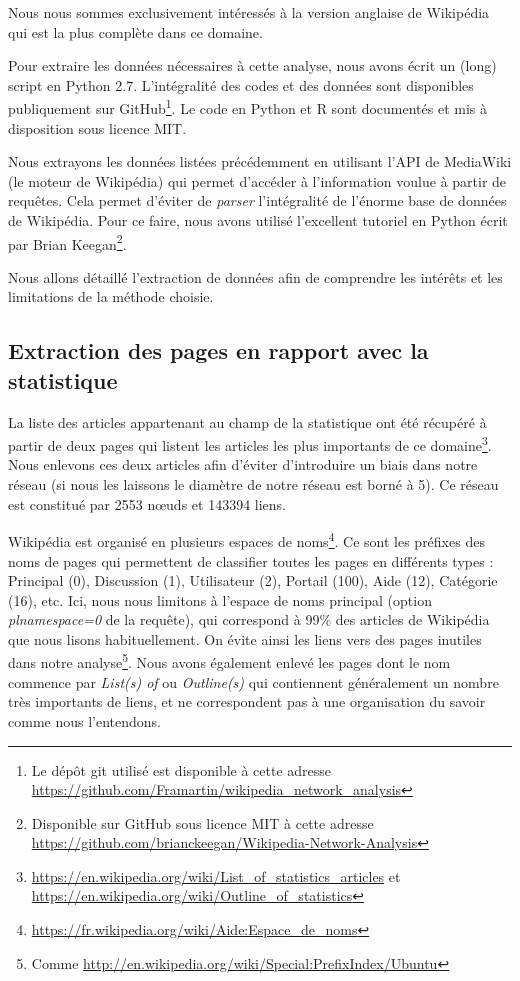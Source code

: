 \documentclass[a4paper]{article}
\begin{document}
Nous nous sommes exclusivement intéressés à la version anglaise de Wikipédia qui est la plus complète dans ce domaine.


Pour extraire les données nécessaires à cette analyse, nous avons écrit un (long) script en Python 2.7. L'intégralité des codes et des données sont disponibles publiquement sur GitHub\footnote{Le dépôt git utilisé est disponible à cette adresse \url{https://github.com/Framartin/wikipedia_network_analysis}}. Le code en Python et R sont documentés et mis à disposition sous licence MIT.

Nous extrayons les données listées précédemment en utilisant l'API de MediaWiki (le moteur de Wikipédia) qui permet d'accéder à l'information voulue à partir de requêtes. Cela permet d'éviter de \textit{parser} l'intégralité de l'énorme base de données de Wikipédia. Pour ce faire, nous avons utilisé l'excellent tutoriel en Python écrit par Brian Keegan\footnote{Disponible sur GitHub sous licence MIT à cette adresse \url{https://github.com/brianckeegan/Wikipedia-Network-Analysis}}.


Nous allons détaillé l'extraction de données afin de comprendre les intérêts et les limitations de la méthode choisie.

    \subsection{Extraction des pages en rapport avec la statistique}

La liste des articles appartenant au champ de la statistique ont été récupéré à partir de deux pages qui listent les articles les plus importants de ce domaine\footnote{\url{https://en.wikipedia.org/wiki/List_of_statistics_articles} et \url{https://en.wikipedia.org/wiki/Outline_of_statistics}}. Nous enlevons ces deux articles afin d'éviter d'introduire un biais dans notre réseau (si nous les laissons le diamètre de notre réseau est borné à 5). Ce réseau est constitué par 2553 nœuds et 143394 liens.

Wikipédia est organisé en plusieurs espaces de noms\footnote{\url{https://fr.wikipedia.org/wiki/Aide:Espace_de_noms}}. Ce sont les préfixes des noms de pages qui permettent de classifier toutes les pages en différents types : Principal (0), Discussion (1), Utilisateur (2), Portail (100), Aide (12), Catégorie (16), etc. Ici, nous nous limitons à l'espace de noms principal (option \textit{plnamespace=0} de la requête), qui correspond à 99\% des articles de Wikipédia que nous lisons habituellement. On évite ainsi les liens vers des pages inutiles dans notre analyse\footnote{Comme \url{http://en.wikipedia.org/wiki/Special:PrefixIndex/Ubuntu}}. Nous avons également enlevé les pages dont le nom commence par \textit{List(s) of} ou \textit{Outline(s)} qui contiennent généralement un nombre très importants de liens, et ne correspondent pas à une organisation du savoir comme nous l'entendons.
\end{document}
